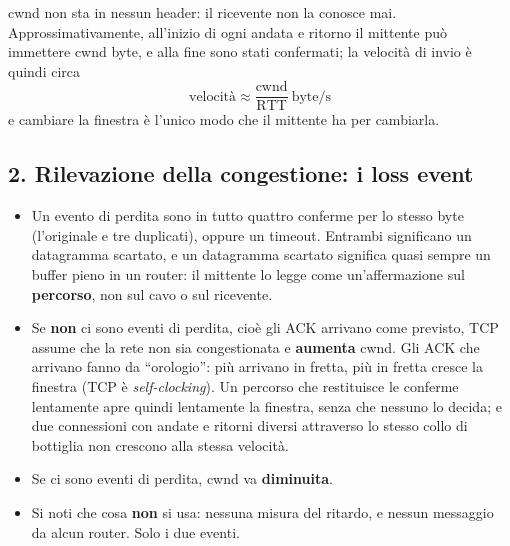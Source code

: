 cwnd non sta in nessun header: il ricevente non la conosce mai. Approssimativamente, all'inizio di ogni andata e ritorno il
mittente può immettere cwnd byte, e alla fine sono stati confermati; la velocità di invio è quindi circa
\[ \text{velocità} \approx \frac{\text{cwnd}}{\text{RTT}} \ \text{byte/s} \]
e cambiare la finestra è l'unico modo che il mittente ha per cambiarla.

\subsection{2. Rilevazione della congestione: i loss event}


\begin{itemize}
    \item Un evento di perdita sono in tutto quattro conferme per lo stesso byte (l'originale e tre duplicati), oppure un
          timeout. Entrambi significano un datagramma scartato, e un datagramma scartato significa quasi sempre un buffer
          pieno in un router: il mittente lo legge come un'affermazione sul \textbf{percorso}, non sul cavo o sul ricevente.
    \item Se \textbf{non} ci sono eventi di perdita, cioè gli ACK arrivano come previsto, TCP assume che la rete non
          sia congestionata e \textbf{aumenta} cwnd. Gli ACK che arrivano fanno da ``orologio'': più arrivano in
          fretta, più in fretta cresce la finestra (TCP è \emph{self-clocking}). Un percorso che restituisce le conferme
          lentamente apre quindi lentamente la finestra, senza che nessuno lo decida; e due connessioni con andate e
          ritorni diversi attraverso lo stesso collo di bottiglia non crescono alla stessa velocità.
    \item Se ci sono eventi di perdita, cwnd va \textbf{diminuita}.
    \item Si noti che cosa \textbf{non} si usa: nessuna misura del ritardo, e nessun messaggio da alcun router. Solo i due
          eventi.
\end{itemize}

